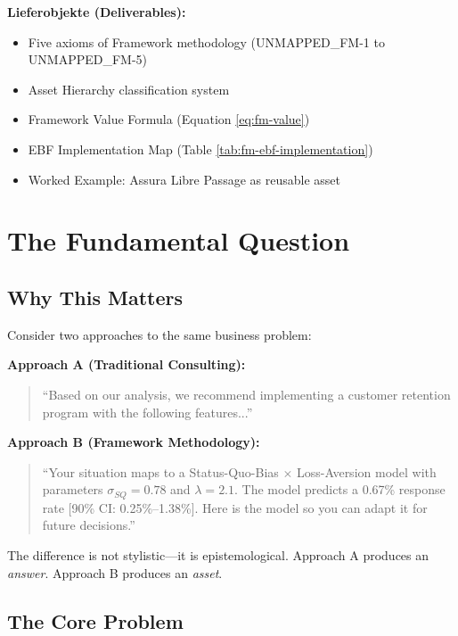 \begin{tcolorbox}[
    colback=orange!5!white,
    colframe=orange!75!black,
    title={\textbf{Appendix Scope: Ziel / In-Scope / Out-of-Scope / Constraints}},
    fonttitle=\bfseries
]
\textbf{Lieferobjekte (Deliverables):}
\begin{itemize}[nosep]
    \item Five axioms of Framework methodology (UNMAPPED_FM-1 to UNMAPPED_FM-5)
    \item Asset Hierarchy classification system
    \item Framework Value Formula (Equation \ref{eq:fm-value})
    \item EBF Implementation Map (Table \ref{tab:fm-ebf-implementation})
    \item Worked Example: Assura Libre Passage as reusable asset
\end{itemize}

\end{tcolorbox}


\section{The Fundamental Question}
\label{sec:fm-fundamental}

\subsection{Why This Matters}

Consider two approaches to the same business problem:

\textbf{Approach A (Traditional Consulting):}
\begin{quote}
``Based on our analysis, we recommend implementing a customer retention program with the following features...''
\end{quote}

\textbf{Approach B (Framework Methodology):}
\begin{quote}
``Your situation maps to a Status-Quo-Bias $\times$ Loss-Aversion model with parameters $\sigma_{SQ} = 0.78$ and $\lambda = 2.1$. The model predicts a 0.67\% response rate [90\% CI: 0.25\%--1.38\%]. Here is the model so you can adapt it for future decisions.''
\end{quote}

The difference is not stylistic---it is epistemological. Approach A produces an \textit{answer}. Approach B produces an \textit{asset}.

\subsection{The Core Problem}

